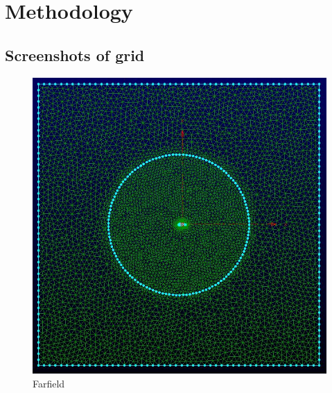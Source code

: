 \section{Methodology}


\subsection{Screenshots of grid}

\begin{figure}[H]
	\centering
	\includegraphics[width=\textwidth]{general_images/farfield}
	\caption{Farfield}
\label{fig:farfield}
\end{figure}

